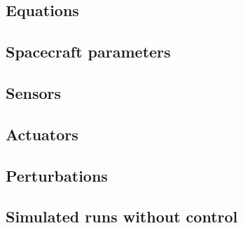 \subsection{Equations}

\subsection{Spacecraft parameters}

\subsection{Sensors}

\subsection{Actuators}

\subsection{Perturbations}

\subsection{Simulated runs without control}

